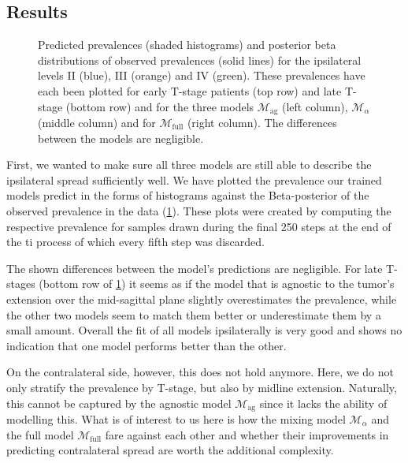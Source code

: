 \documentclass[\relativeRoot/main.tex]{subfiles}
\begin{document}
\subsection{Results}
\label{subsec:bilateral:model_comp:results}

\begin{figure}
    \def\svgwidth{1.0\textwidth}
    
    \caption[Comparison of ipsilateral prevalences]{
        Predicted prevalences (shaded histograms) and posterior beta distributions of observed prevalences (solid lines) for the ipsilateral levels II (blue), III (orange) and IV (green). These prevalences have each been plotted for early T-stage patients (top row) and late T-stage (bottom row) and for the three models $\mathcal{M}_\text{ag}$ (left column), $\mathcal{M}_\alpha$ (middle column) and for $\mathcal{M}_\text{full}$ (right column). The differences between the models are negligible.
    }
    \label{fig:bilateral:model_comp:ipsi}
\end{figure}

First, we wanted to make sure all three models are still able to describe the ipsilateral spread sufficiently well. We have plotted the prevalence our trained models predict in the forms of histograms against the Beta-posterior of the observed prevalence in the data (\cref{fig:bilateral:model_comp:ipsi}). These plots were created by computing the respective prevalence for samples drawn during the final 250 steps at the end of the \gls{ti} process of which every fifth step was discarded.

The shown differences between the model's predictions are negligible. For late T-stages (bottom row of \cref{fig:bilateral:model_comp:ipsi}) it seems as if the model that is agnostic to the tumor's extension over the mid-sagittal plane slightly overestimates the prevalence, while the other two models seem to match them better or underestimate them by a small amount. Overall the fit of all models ipsilaterally is very good and shows no indication that one model performs better than the other.

On the contralateral side, however, this does not hold anymore. Here, we do not only stratify the prevalence by T-stage, but also by midline extension. Naturally, this cannot be captured by the agnostic model $\mathcal{M}_\text{ag}$ since it lacks the ability of modelling this. What is of interest to us here is how the mixing model $\mathcal{M}_\alpha$ and the full model $\mathcal{M}_\text{full}$ fare against each other and whether their improvements in predicting contralateral spread are worth the additional complexity.
\end{document}
